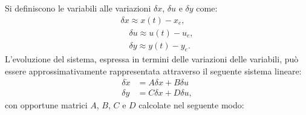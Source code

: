 \documentclass[a4paper, 11pt]{article}
\begin{document}
%
Si definiscono le variabili alle variazioni $\delta x$, $\delta u$ e $\delta y$ come:
%
\begin{align*}
	\delta x \approx x(t)-x_e, \\
	\quad 
	\delta u \approx u(t)-u_e, \\
	\quad
	\delta y \approx y(t)-y_e. 
\end{align*}
%
L’evoluzione del sistema, espressa in termini delle variazioni delle variabili, può essere approssimativamente rappresentata attraverso il seguente sistema lineare:
%
\begin{subequations}\label{eq:linearized_system}
\begin{align}
	\delta \dot{x} &= A\delta x + B\delta u
	\\
	\delta y &= C\delta x + D\delta u,
\end{align}
\end{subequations}
%
con opportune matrici $A$, $B$, $C$ e $D$  calcolate nel seguente modo:
%
\end{document}
